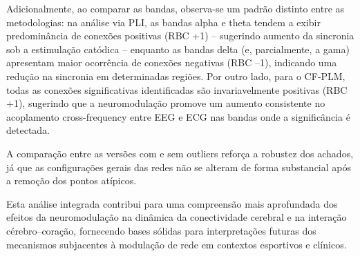 Adicionalmente, ao comparar as bandas, observa-se um padrão distinto entre as metodologias: na análise via PLI, as bandas alpha e theta tendem a exibir predominância de conexões positivas (RBC +1) – sugerindo aumento da sincronia sob a estimulação catódica – enquanto as bandas delta (e, parcialmente, a gama) apresentam maior ocorrência de conexões negativas (RBC –1), indicando uma redução na sincronia em determinadas regiões. Por outro lado, para o CF‐PLM, todas as conexões significativas identificadas são invariavelmente positivas (RBC +1), sugerindo que a neuromodulação promove um aumento consistente no acoplamento cross-frequency entre EEG e ECG nas bandas onde a significância é detectada.

A comparação entre as versões com e sem outliers reforça a robustez dos achados, já que as configurações gerais das redes não se alteram de forma substancial após a remoção dos pontos atípicos.

Esta análise integrada contribui para uma compreensão mais aprofundada dos efeitos da neuromodulação na dinâmica da conectividade cerebral e na interação cérebro–coração, fornecendo bases sólidas para interpretações futuras dos mecanismos subjacentes à modulação de rede em contextos esportivos e clínicos.